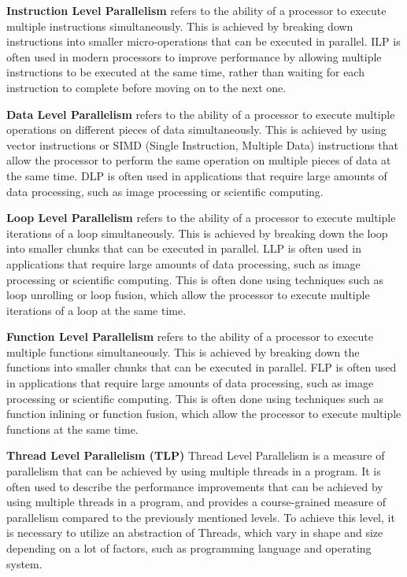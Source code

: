 \documentclass[12pt,a4paper]{article}
\begin{document}
\textbf{Instruction Level Parallelism} refers to the ability of a processor to execute multiple instructions simultaneously. This is achieved by breaking down instructions into smaller micro-operations that can be executed in parallel. ILP is often used in modern processors to improve performance by allowing multiple instructions to be executed at the same time, rather than waiting for each instruction to complete before moving on to the next one.

\textbf{Data Level Parallelism} refers to the ability of a processor to execute multiple operations on different pieces of data simultaneously. This is achieved by using vector instructions or SIMD (Single Instruction, Multiple Data) instructions that allow the processor to perform the same operation on multiple pieces of data at the same time. DLP is often used in applications that require large amounts of data processing, such as image processing or scientific computing.

\textbf{Loop Level Parallelism} refers to the ability of a processor to execute multiple iterations of a loop simultaneously. This is achieved by breaking down the loop into smaller chunks that can be executed in parallel. LLP is often used in applications that require large amounts of data processing, such as image processing or scientific computing. This is often done using techniques such as loop unrolling or loop fusion, which allow the processor to execute multiple iterations of a loop at the same time.

\textbf{Function Level Parallelism} refers to the ability of a processor to execute multiple functions simultaneously. This is achieved by breaking down the functions into smaller chunks that can be executed in parallel. FLP is often used in applications that require large amounts of data processing, such as image processing or scientific computing. This is often done using techniques such as function inlining or function fusion, which allow the processor to execute multiple functions at the same time. 

\textbf{Thread Level Parallelism (TLP)}
Thread Level Parallelism is a measure of parallelism that can be achieved by using multiple threads in a program\parencite{Rauber2023}. It is often used to describe the performance improvements that can be achieved by using multiple threads in a program, and provides a course-grained measure of parallelism compared to the previously mentioned levels. To achieve this level, it is necessary to utilize an abstraction of Threads, which vary in shape and size depending on a lot of factors, such as programming language and operating system.
\end{document}

